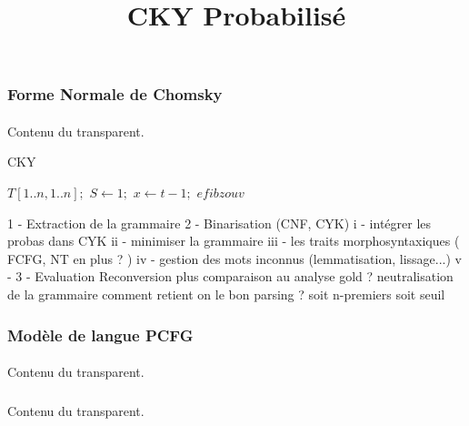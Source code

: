 \documentclass{beamer}
\begin{document}
\title{CKY Probabilisé}
\maketitle

\begin{frame}
\frametitle{Forme Normale de Chomsky}
\framesubtitle{}

Contenu du transparent.

\end{frame}



\begin{algorithm}
\caption{CKY}
\label{cky}
	\begin{algorithmic}
			\State $T[1..n,1..n];$
			\State $S \gets 1;$
				\State $x \gets t-1;$
					\State $efibzouv$
				\EndFor
			\EndFor
		\EndFunction
	\end{algorithmic}
\end{algorithm}
1 - Extraction de la grammaire
2 - Binarisation (CNF, CYK)
	i -    intégrer les probas dans CYK
	ii -   minimiser la grammaire
	iii -  les traits morphosyntaxiques ( FCFG, NT en plus ? )
	iv -  gestion des mots inconnus (lemmatisation, lissage...)
	v - 
3 - Evaluation
	Reconversion plus comparaison au analyse gold
	? neutralisation de la grammaire
	comment retient on le bon parsing ?
			soit n-premiers
			soit seuil

\begin{frame}
\frametitle{Modèle de langue PCFG}
\framesubtitle{}

Contenu du transparent.

\end{frame}


\begin{frame}
\frametitle{}
\framesubtitle{}

Contenu du transparent.

\end{frame}
\end{document}
